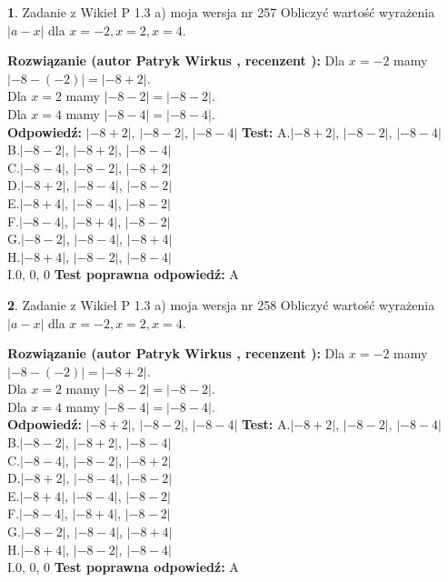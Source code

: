 \documentclass[12pt, a4paper]{article}
\theoremstyle{definition} %
\newtheorem{zad}{}
\newcommand{\zadStart}[1]{\begin{zad}#1\newline}
\newcommand{\zadStop}{\end{zad}}
\newcommand{\rozwStart}[2]{\noindent \textbf{Rozwiązanie (autor #1 , recenzent #2): }\newline}
\newcommand{\rozwStop}{\newline}
\newcommand{\odpStart}{\noindent \textbf{Odpowiedź:}\newline}
\newcommand{\odpStop}{\newline}
\newcommand{\testStart}{\noindent \textbf{Test:}\newline}
\newcommand{\testStop}{\newline}
\newcommand{\kluczStart}{\noindent \textbf{Test poprawna odpowiedź:}\newline}
\newcommand{\kluczStop}{\newline}
\begin{document}
\zadStart{Zadanie z Wikieł P 1.3 a) moja wersja nr 257}
Obliczyć wartość wyrażenia $|a - x|$ dla $x=-2,x=2,x=4$.
\zadStop
\rozwStart{Patryk Wirkus}{}
Dla $x = -2$ mamy $|-8 - (-2)| = |-8 + 2|$.\\
Dla $x = 2$ mamy $|-8 - 2| = |-8 - 2|$.\\
Dla $x = 4$ mamy $|-8 - 4| = |-8 - 4|$.\\
\rozwStop
\odpStart
$|-8 + 2|$, $|-8 - 2|$, $|-8 - 4|$
\odpStop
\testStart
A.$|-8 + 2|$, $|-8 - 2|$, $|-8 - 4|$\\
B.$|-8 - 2|$, $|-8 + 2|$, $|-8 - 4|$\\
C.$|-8 - 4|$, $|-8 - 2|$, $|-8 + 2|$\\
D.$|-8 + 2|$, $|-8 - 4|$, $|-8 - 2|$\\
E.$|-8 + 4|$, $|-8 - 4|$, $|-8 - 2|$\\
F.$|-8 - 4|$, $|-8 + 4|$, $|-8 - 2|$\\
G.$|-8 - 2|$, $|-8 - 4|$, $|-8 + 4|$\\
H.$|-8 + 4|$, $|-8 - 2|$, $|-8 - 4|$\\
I.$0$, $0$, $0$
\testStop
\kluczStart
A
\kluczStop



\zadStart{Zadanie z Wikieł P 1.3 a) moja wersja nr 258}
Obliczyć wartość wyrażenia $|a - x|$ dla $x=-2,x=2,x=4$.
\zadStop
\rozwStart{Patryk Wirkus}{}
Dla $x = -2$ mamy $|-8 - (-2)| = |-8 + 2|$.\\
Dla $x = 2$ mamy $|-8 - 2| = |-8 - 2|$.\\
Dla $x = 4$ mamy $|-8 - 4| = |-8 - 4|$.\\
\rozwStop
\odpStart
$|-8 + 2|$, $|-8 - 2|$, $|-8 - 4|$
\odpStop
\testStart
A.$|-8 + 2|$, $|-8 - 2|$, $|-8 - 4|$\\
B.$|-8 - 2|$, $|-8 + 2|$, $|-8 - 4|$\\
C.$|-8 - 4|$, $|-8 - 2|$, $|-8 + 2|$\\
D.$|-8 + 2|$, $|-8 - 4|$, $|-8 - 2|$\\
E.$|-8 + 4|$, $|-8 - 4|$, $|-8 - 2|$\\
F.$|-8 - 4|$, $|-8 + 4|$, $|-8 - 2|$\\
G.$|-8 - 2|$, $|-8 - 4|$, $|-8 + 4|$\\
H.$|-8 + 4|$, $|-8 - 2|$, $|-8 - 4|$\\
I.$0$, $0$, $0$
\testStop
\kluczStart
A
\kluczStop
\end{document}
